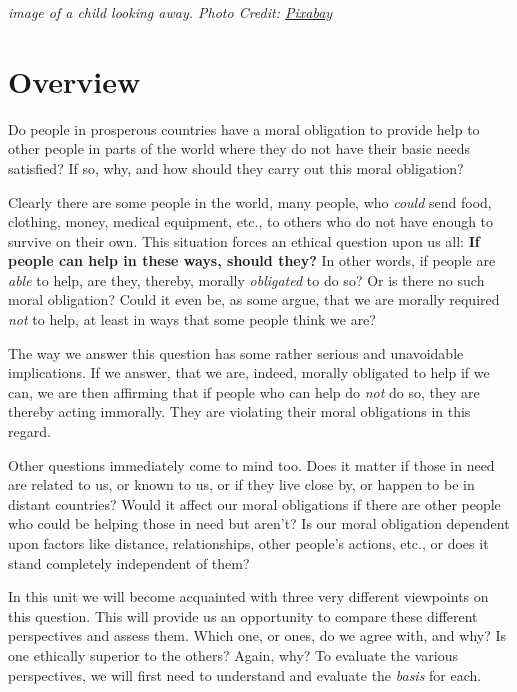 \documentclass[
]{book}
\begin{document}
\emph{image of a child looking away. Photo Credit: \href{https://pixabay.com/en/kid-child-sad-red-stripe-shirt-2101832/}{Pixabay}}

\hypertarget{overview-9}{%
\section*{Overview}\label{overview-9}}

Do people in prosperous countries have a moral obligation to provide help to other people in parts of the world where they do not have their basic needs satisfied? If so, why, and how should they carry out this moral obligation?

Clearly there are some people in the world, many people, who \emph{could} send food, clothing, money, medical equipment, etc., to others who do not have enough to survive on their own. This situation forces an ethical question upon us all: \textbf{If people can help in these ways, should they?} In other words, if people are \emph{able} to help, are they, thereby, morally \emph{obligated} to do so? Or is there no such moral obligation? Could it even be, as some argue, that we are morally required \emph{not} to help, at least in ways that some people think we are?

The way we answer this question has some rather serious and unavoidable implications. If we answer, that we are, indeed, morally obligated to help if we can, we are then affirming that if people who can help do \emph{not} do so, they are thereby acting immorally. They are violating their moral obligations in this regard.

Other questions immediately come to mind too. Does it matter if those in need are related to us, or known to us, or if they live close by, or happen to be in distant countries? Would it affect our moral obligations if there are other people who could be helping those in need but aren't? Is our moral obligation dependent upon factors like distance, relationships, other people's actions, etc., or does it stand completely independent of them?

In this unit we will become acquainted with three very different viewpoints on this question. This will provide us an opportunity to compare these different perspectives and assess them. Which one, or ones, do we agree with, and why? Is one ethically superior to the others? Again, why? To evaluate the various perspectives, we will first need to understand and evaluate the \emph{basis} for each.
\end{document}
